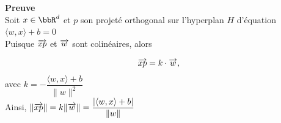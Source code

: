 \documentclass[10pt]{beamer}
\let\oldoverrightarrow\overrightarrow
\renewcommand{\overrightarrow}[2][]{{%
		\if$#1$\else\color{#1}\fi%
		\oldoverrightarrow{\color{black}#2}%
}}
\begin{document}
\begin{frame}{}
\textbf{Preuve} \\[2em]

Soit $x\in \bbR^d$ et $p$ son projeté orthogonal sur l'hyperplan $H$ d'équation $\langle w,x\rangle + b = 0$\\[1em]  

Puisque $\overrightarrow{xp} $ et $ \overrightarrow{w}$ sont colinéaires, alors 

$$ \overrightarrow{xp} = k\cdot \overrightarrow{w}, $$ 
avec $k =- \dfrac{\langle w,x\rangle +b}{\| w\|^2}$  \\[1em]

Ainsi, $\|\overrightarrow{xp}\| = k \|\overrightarrow{w}\| = \dfrac{\vert \langle w,x \rangle +b \vert}{\| w\|}$\\[10em]
	
\end{frame}
\end{document}
